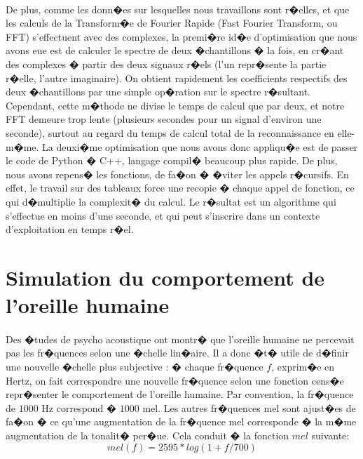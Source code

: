 \paragraph{}
De plus, comme les donn�es sur lesquelles nous travaillons sont r�elles, et que les calculs de la Transform�e de Fourier Rapide (Fast Fourier Transform, ou FFT) 
s'effectuent avec des complexes, la premi�re id�e d'optimisation que nous avons eue est de calculer le spectre de deux �chantillons � la fois, en cr�ant 
des complexes � partir des deux signaux r�els (l'un repr�sente la partie r�elle, l'autre imaginaire). On obtient rapidement les coefficients 
respectifs des deux �chantillons par une simple op�ration sur le spectre r�sultant. Cependant, cette m�thode ne divise le temps de calcul que par deux, et notre 
FFT demeure trop lente (plusieurs secondes pour un signal d'environ une seconde), surtout au regard du temps de calcul total de la reconnaissance en elle-m�me. 
La deuxi�me optimisation que nous avons donc appliqu�e est de passer le code de Python � C++, langage compil� beaucoup plus rapide. De plus, nous avons repens� les
fonctions, de fa�on � �viter les appels r�cursifs. En effet, le travail sur des tableaux force une recopie � chaque appel de fonction, ce qui d�multiplie la complexit� du calcul. 
Le r�sultat est un algorithme qui s'effectue en moins d'une seconde, et qui peut s'inscrire dans un contexte d'exploitation en temps r�el.


        	\section{Simulation du comportement de l'oreille humaine}
        	\paragraph{}
        	Des �tudes de psycho acoustique ont montr� que l'oreille humaine ne percevait pas les fr�quences selon une �chelle lin�aire\cite{melproof}. Il a donc �t� utile de d�finir une nouvelle �chelle plus subjective : � chaque fr�quence $f$, exprim�e en Hertz, on fait correspondre une nouvelle fr�quence selon une fonction cens�e repr�senter le comportement de l'oreille humaine. Par convention, la fr�quence de $1 000$ Hz correspond � $1 000$ mel. Les autres fr�quences mel sont ajust�es de fa�on � ce qu'une augmentation de la fr�quence mel corresponde � la m�me augmentation de la tonalit� per�ue. Cela conduit � la fonction $mel$ suivante: \[mel(f) = 2595*log(1+f/700)\]
        	
